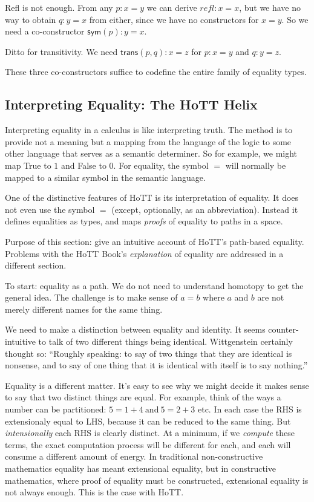 \documentclass{article}
\begin{document}
Refl is not enough. From any \(p:x=y\) we can derive \(refl:x=x\), but
we have no way to obtain \(q:y=x\) from either, since we have no
constructors for \(x=y\). So we need a co-constructor
\(\mathsf{sym}(p): y=x\).

Ditto for transitivity. We need \(\mathsf{trans}(p,q): x=z\) for
\(p:x=y\) and \(q:y=z\).

These three co-constructors suffice to codefine the entire family of
equality types.

\subsection{Interpreting Equality: The HoTT Helix}

Interpreting equality in a calculus is like interpreting truth. The
method is to provide not a meaning but a mapping from the language of
the logic to some other language that serves as a semantic determiner.
So for example, we might map \textsf{True} to \(1\) and \textsf{False}
to 0. For equality, the symbol \(=\) will normally be mapped to a
similar symbol in the semantic language.

One of the distinctive features of HoTT is its interpretation of
equality. It does not even use the symbol \(=\) (except, optionally,
as an abbreviation). Instead it defines equalities as types, and maps
\textit{proofs} of equality to paths in a space.

Purpose of this section: give an intuitive account of HoTT's
path-based equality. Problems with the HoTT Book's
\textit{explanation} of equality are addressed in a different section.

To start: equality as a path. We do not need to understand homotopy to
get the general idea. The challenge is to make sense of \(a=b\) where
\(a\) and \(b\) are not merely different names for the same thing.

We need to make a distinction between equality and identity. It seems
counter-intuitive to talk of two different things being identical.
Wittgenstein certainly thought so: \enquote{Roughly speaking: to say
  of two things that they are identical is nonsense, and to say of one
  thing that it is identical with itself is to say nothing.}

Equality is a different matter. It's easy to see why we might decide
it makes sense to say that two distinct things are equal. For example,
think of the ways a number can be partitioned:
\(5=1+4\ \text{and}\ 5=2+3\) etc. In each case the RHS
is extensionaly equal to LHS, because it can be reduced to the same
thing. But \textit{intensionally} each RHS is clearly distinct. At a
minimum, if we \textit{compute} these terms, the exact computation
process will be different for each, and each will consume a different
amount of energy. In traditional non-constructive mathematics equality
has meant extensional equality, but in constructive mathematics, where
proof of equality must be constructed, extensional equality is not
always enough. This is the case with HoTT.
\end{document}
